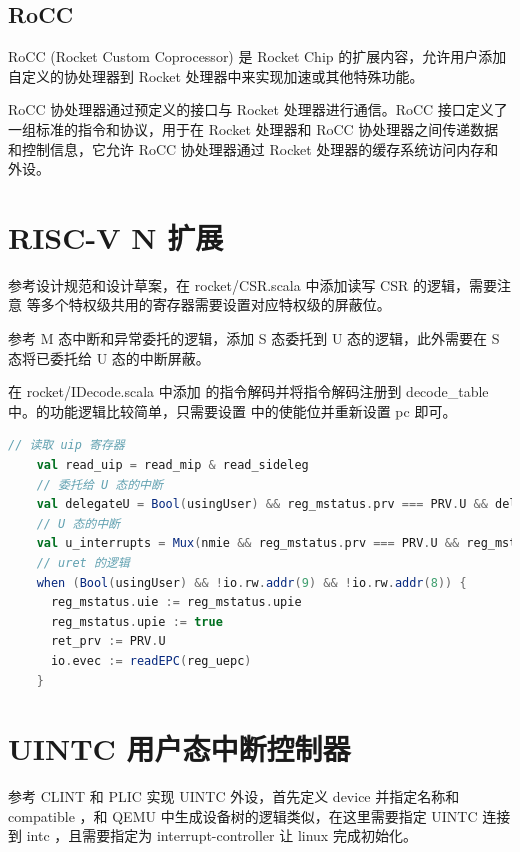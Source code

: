 \subsection{RoCC}

RoCC (Rocket Custom Coprocessor) \cite{rocc} 是 Rocket Chip 的扩展内容，允许用户添加自定义的协处理器到 Rocket 处理器中来实现加速或其他特殊功能。

RoCC 协处理器通过预定义的接口与 Rocket 处理器进行通信。RoCC 接口定义了一组标准的指令和协议，用于在 Rocket 处理器和 RoCC 协处理器之间传递数据和控制信息，它允许 RoCC 协处理器通过 Rocket 处理器的缓存系统访问内存和外设。

\section{RISC-V N 扩展}

参考设计规范和设计草案，在 rocket/CSR.scala 中添加读写 CSR 的逻辑，需要注意 \Ruip 等多个特权级共用的寄存器需要设置对应特权级的屏蔽位。

参考 M 态中断和异常委托的逻辑，添加 S 态委托到 U 态的逻辑，此外需要在 S 态将已委托给 U 态的中断屏蔽。

在 rocket/IDecode.scala 中添加 \Iuret 的指令解码并将指令解码注册到 decode\_table 中。\Iuret 的功能逻辑比较简单，只需要设置 \Rustatus 中的使能位并重新设置 pc 即可。

\begin{lstlisting}[style=CStyle,language=scala]
    // 读取 uip 寄存器
    val read_uip = read_mip & read_sideleg
    // 委托给 U 态的中断
    val delegateU = Bool(usingUser) && reg_mstatus.prv === PRV.U && delegate && read_sideleg(cause_lsbs) && cause(xLen - 1)
    // U 态的中断
    val u_interrupts = Mux(nmie && reg_mstatus.prv === PRV.U && reg_mstatus.uie, pending_interrupts & read_sideleg, UInt(0))
    // uret 的逻辑
    when (Bool(usingUser) && !io.rw.addr(9) && !io.rw.addr(8)) {
      reg_mstatus.uie := reg_mstatus.upie
      reg_mstatus.upie := true
      ret_prv := PRV.U
      io.evec := readEPC(reg_uepc)
    }
\end{lstlisting}

\section{UINTC 用户态中断控制器}

参考 CLINT 和 PLIC 实现 UINTC 外设，首先定义 device 并指定名称和 compatible ，和 QEMU 中生成设备树的逻辑类似，在这里需要指定 UINTC 连接到 intc ，且需要指定为 interrupt-controller 让 linux 完成初始化。


